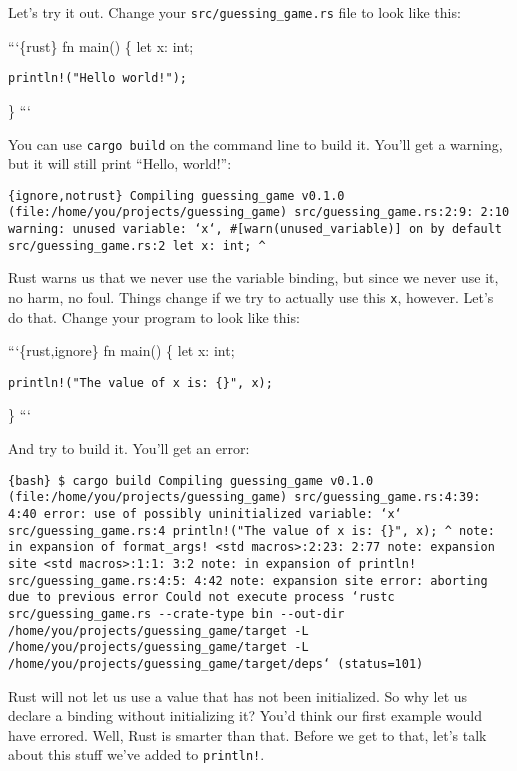 \documentclass[]{article}
\begin{document}
Let's try it out. Change your \texttt{src/guessing\_game.rs} file to
look like this:

```\{rust\} fn main() \{ let x: int;

\begin{verbatim}
println!("Hello world!");
\end{verbatim}

\} ```

You can use \texttt{cargo build} on the command line to build it. You'll
get a warning, but it will still print ``Hello, world!'':

\texttt{\{ignore,notrust\}    Compiling guessing\_game v0.1.0 (file:/home/you/projects/guessing\_game) src/guessing\_game.rs:2:9: 2:10 warning: unused variable: `x`, \#{[}warn(unused\_variable){]} on by default src/guessing\_game.rs:2     let x: int;                                \^{}}

Rust warns us that we never use the variable binding, but since we never
use it, no harm, no foul. Things change if we try to actually use this
\texttt{x}, however. Let's do that. Change your program to look like
this:

```\{rust,ignore\} fn main() \{ let x: int;

\begin{verbatim}
println!("The value of x is: {}", x);
\end{verbatim}

\} ```

And try to build it. You'll get an error:

\texttt{\{bash\} \$ cargo build    Compiling guessing\_game v0.1.0 (file:/home/you/projects/guessing\_game) src/guessing\_game.rs:4:39: 4:40 error: use of possibly uninitialized variable: `x` src/guessing\_game.rs:4     println!("The value of x is: \{\}", x);                                                              \^{} note: in expansion of format\_args! \textless{}std macros\textgreater{}:2:23: 2:77 note: expansion site \textless{}std macros\textgreater{}:1:1: 3:2 note: in expansion of println! src/guessing\_game.rs:4:5: 4:42 note: expansion site error: aborting due to previous error Could not execute process `rustc src/guessing\_game.rs -\/-crate-type bin -\/-out-dir /home/you/projects/guessing\_game/target -L /home/you/projects/guessing\_game/target -L /home/you/projects/guessing\_game/target/deps` (status=101)}

Rust will not let us use a value that has not been initialized. So why
let us declare a binding without initializing it? You'd think our first
example would have errored. Well, Rust is smarter than that. Before we
get to that, let's talk about this stuff we've added to
\texttt{println!}.
\end{document}
